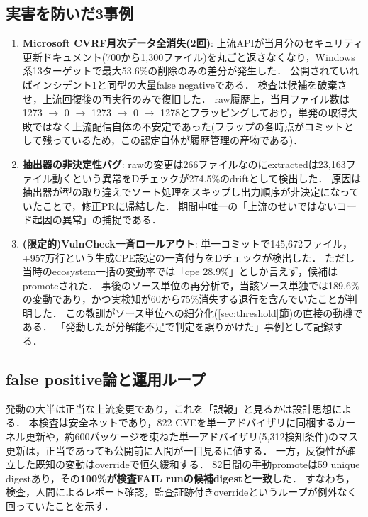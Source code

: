\documentclass{css}
\begin{document}
\subsection{実害を防いだ3事例}
\label{sec:prevented}

\begin{enumerate}
\item \textbf{Microsoft CVRF月次データ全消失(2回)}:
上流APIが当月分のセキュリティ更新ドキュメント(700から1,300ファイル)を丸ごと返さなくなり，Windows系13ターゲットで最大53.6\%の削除のみの差分が発生した．
公開されていればインシデント1と同型の大量false negativeである．
検査は候補を破棄させ，上流回復後の再実行のみで復旧した．
raw履歴上，当月ファイル数は1273 $\rightarrow$ 0 $\rightarrow$ 1273 $\rightarrow$ 0 $\rightarrow$ 1278とフラッピングしており，単発の取得失敗ではなく上流配信自体の不安定であった(フラップの各時点がコミットとして残っているため，この認定自体が履歴管理の産物である)．
\item \textbf{抽出器の非決定性バグ}:
rawの変更は266ファイルなのにextractedは23,163ファイル動くという異常をDチェックが274.5\%のdriftとして検出した．
原因は抽出器が型の取り違えでソート処理をスキップし出力順序が非決定になっていたことで，修正PRに帰結した．
期間中唯一の「上流のせいではないコード起因の異常」の捕捉である．
\item \textbf{(限定的)VulnCheck一斉ロールアウト}:
単一コミットで145,672ファイル，+957万行という生成CPE設定の一斉付与をDチェックが検出した．
ただし当時のecosystem一括の変動率では「cpe 28.9\%」としか言えず，候補はpromoteされた．
事後のソース単位の再分析で，当該ソース単独では189.6\%の変動であり，かつ実検知が60から75\%消失する退行を含んでいたことが判明した．
この教訓がソース単位への細分化(\ref{sec:threshold}節)の直接の動機である．
「発動したが分解能不足で判定を誤りかけた」事例として記録する．
\end{enumerate}

\subsection{false positive論と運用ループ}
\label{sec:fp}

発動の大半は正当な上流変更であり，これを「誤報」と見るかは設計思想による．
本検査は安全ネットであり，822 CVEを単一アドバイザリに同梱するカーネル更新や，約600パッケージを束ねた単一アドバイザリ(5,312検知条件)のマス更新は，正当であっても公開前に人間が一目見るに値する．
一方，反復性が確立した既知の変動はoverrideで恒久緩和する．
82日間の手動promoteは59 unique digestあり，その\textbf{100\%が検査FAIL runの候補digestと一致}した．
すなわち，検査，人間によるレポート確認，監査証跡付きoverrideというループが例外なく回っていたことを示す．
\end{document}
